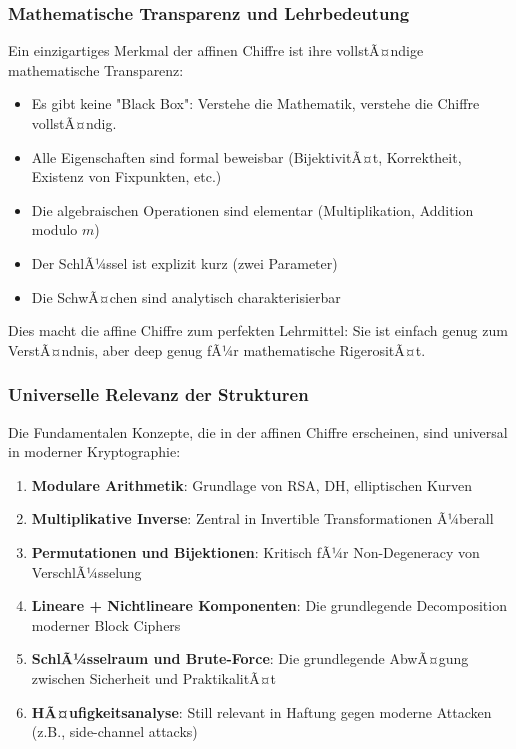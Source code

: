 ﻿\documentclass[12pt,a4paper]{article}
\begin{document}
	\subsubsection{Mathematische Transparenz und Lehrbedeutung}
	
	Ein einzigartiges Merkmal der affinen Chiffre ist ihre vollstÃ¤ndige mathematische Transparenz:
	
	\begin{itemize}
		\item Es gibt keine "Black Box": Verstehe die Mathematik, verstehe die Chiffre vollstÃ¤ndig.
		\item Alle Eigenschaften sind formal beweisbar (BijektivitÃ¤t, Korrektheit, Existenz von Fixpunkten, etc.)
		\item Die algebraischen Operationen sind elementar (Multiplikation, Addition modulo $m$)
		\item Der SchlÃ¼ssel ist explizit kurz (zwei Parameter)
		\item Die SchwÃ¤chen sind analytisch charakterisierbar
	\end{itemize}
	
	Dies macht die affine Chiffre zum perfekten Lehrmittel: Sie ist einfach genug zum VerstÃ¤ndnis, aber deep genug fÃ¼r mathematische RigerositÃ¤t.
	
	\subsubsection{Universelle Relevanz der Strukturen}
	
	Die Fundamentalen Konzepte, die in der affinen Chiffre erscheinen, sind universal in moderner Kryptographie:
	
	\begin{enumerate}
		\item \textbf{Modulare Arithmetik}: Grundlage von RSA, DH, elliptischen Kurven
		\item \textbf{Multiplikative Inverse}: Zentral in Invertible Transformationen Ã¼berall
		\item \textbf{Permutationen und Bijektionen}: Kritisch fÃ¼r Non-Degeneracy von VerschlÃ¼sselung
		\item \textbf{Lineare + Nichtlineare Komponenten}: Die grundlegende Decomposition moderner Block Ciphers
		\item \textbf{SchlÃ¼sselraum und Brute-Force}: Die grundlegende AbwÃ¤gung zwischen Sicherheit und PraktikalitÃ¤t
		\item \textbf{HÃ¤ufigkeitsanalyse}: Still relevant in Haftung gegen moderne Attacken (z.B., side-channel attacks)
	\end{enumerate}
	
\end{document}
